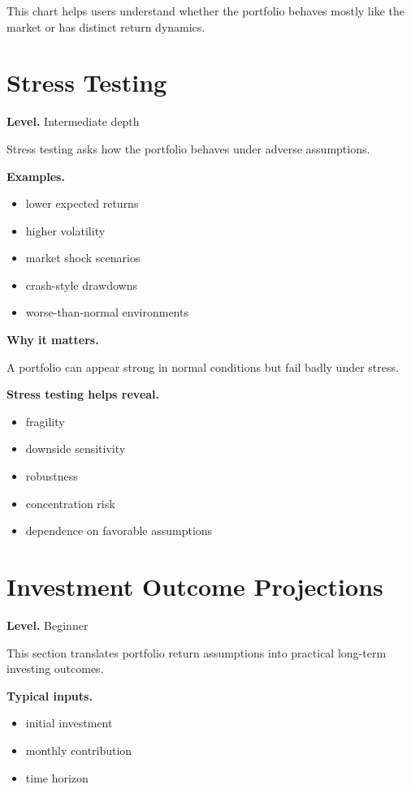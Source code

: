 \documentclass[11pt]{report}
\begin{document}
This chart helps users understand whether the portfolio behaves mostly like the market or has distinct return dynamics.

\section{Stress Testing}
\begin{callout}
\textbf{Level.} Intermediate depth
\end{callout}

Stress testing asks how the portfolio behaves under adverse assumptions.

\textbf{Examples.}

\begin{itemize}
\item lower expected returns
\item higher volatility
\item market shock scenarios
\item crash-style drawdowns
\item worse-than-normal environments
\end{itemize}

\textbf{Why it matters.}

A portfolio can appear strong in normal conditions but fail badly under stress.

\textbf{Stress testing helps reveal.}

\begin{itemize}
\item fragility
\item downside sensitivity
\item robustness
\item concentration risk
\item dependence on favorable assumptions
\end{itemize}

\section{Investment Outcome Projections}
\begin{callout}
\textbf{Level.} Beginner
\end{callout}

This section translates portfolio return assumptions into practical long-term investing outcomes.

\textbf{Typical inputs.}

\begin{itemize}
\item initial investment
\item monthly contribution
\item time horizon
\end{itemize}
\end{document}
